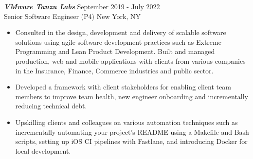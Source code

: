 {\sl \textbf{VMware Tanzu Labs}} \hfill September 2019 - July 2022 \\ Senior Software Engineer (P4) \hfill New York, NY
\begin{itemize}
    \item Consulted in the design, development and delivery of scalable software solutions using agile software development practices such as Extreme Programming and Lean Product Development. Built and managed production, web and mobile applications with clients from various companies in the Insurance, Finance, Commerce industries and public sector.
    \item Developed a framework with client stakeholders for enabling client team members to improve team health, new engineer onboarding and incrementally reducing technical debt.
    \item Upskilling clients and colleagues on various automation techniques such as incrementally automating your project's README using a Makefile and Bash scripts, setting up iOS CI pipelines with Fastlane, and introducing Docker for local development.
\end{itemize}

